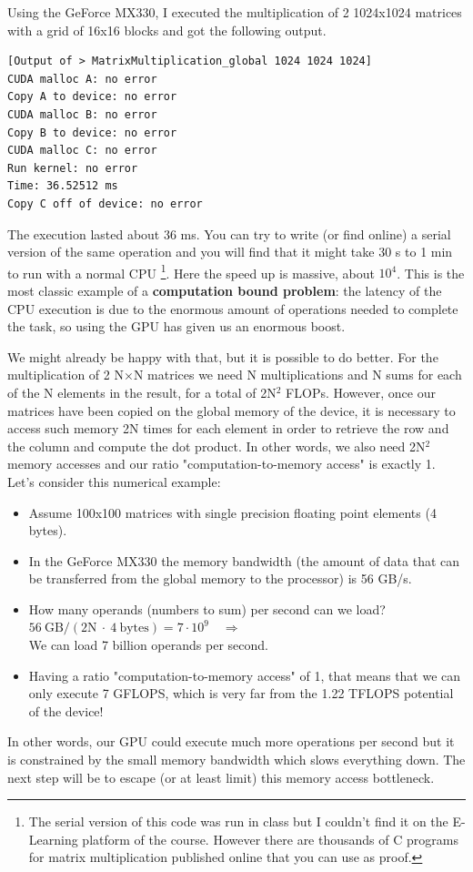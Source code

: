 Using the GeForce MX330, I executed the multiplication of 2 1024x1024 matrices with a grid of 16x16 blocks and got the following output. 
\begin{Verbatim}
[Output of > MatrixMultiplication_global 1024 1024 1024]
CUDA malloc A: no error
Copy A to device: no error
CUDA malloc B: no error
Copy B to device: no error
CUDA malloc C: no error
Run kernel: no error
Time: 36.52512 ms
Copy C off of device: no error
\end{Verbatim}
The execution lasted about 36 ms. You can try to write (or find online) a serial version of the same operation and you will find that it might take 30 s to 1 min to run with a normal CPU \footnote{The serial version of this code was run in class but I couldn't find it on the E-Learning platform of the course. However there are thousands of C programs for matrix multiplication published online that you can use as proof.}. Here the speed up is massive, about $10^4$. This is the most classic example of a \textbf{computation bound problem}: the latency of the CPU execution is due to the enormous amount of operations needed to complete the task, so using the GPU has given us an enormous boost.

We might already be happy with that, but it is possible to do better. For the multiplication of 2 N$\times$N matrices we need N multiplications and N sums for each of the N elements in the result, for a total of 2N$^2$ FLOPs. However, once our matrices have been copied on the global memory of the device, it is necessary to access such memory 2N times for each element in order to retrieve the row and the column and compute the dot product. In other words, we also need 2N$^2$ memory accesses and our ratio "computation-to-memory access" is exactly 1. Let's consider this numerical example:
\begin{itemize}
    \item[-] Assume 100x100 matrices with single precision floating point elements (4 bytes).
    \item[-] In the GeForce MX330 the memory bandwidth (the amount of data that can be transferred from the global memory to the processor) is 56 GB/s.
    \item[-] How many operands (numbers to sum) per second can we load? \\ $56 \ \text{GB} / (2\text{N} \ \cdot \ 4 \ \text{bytes})=7\cdot10^9 \quad \Rightarrow$ \\
    We can load 7 billion operands per second.
    \item[-] Having a ratio "computation-to-memory access" of 1, that means that we can only execute 7 GFLOPS, which is very far from the 1.22 TFLOPS potential of the device!
\end{itemize}
In other words, our GPU could execute much more operations per second but it is constrained by the small memory bandwidth which slows everything down. The next step will be to escape (or at least limit) this memory access bottleneck.

